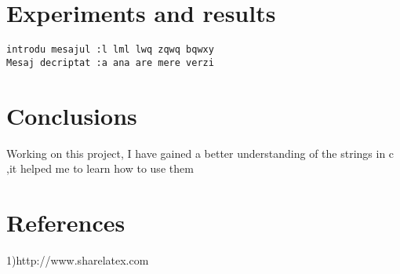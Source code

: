 \documentclass[14pt]{article}
\begin{document}
\section*{Experiments and results}
\begin{lstlisting}
introdu mesajul :l lml lwq zqwq bqwxy
Mesaj decriptat :a ana are mere verzi

\end{lstlisting}

\newpage
\section*{Conclusions}
\vspace{20 mm}
Working on this project, I have gained a better understanding of the strings in c ,it helped me to learn how to use them
\section*{References}
\vspace{20 mm}
1)http://www.sharelatex.com
\end{document}
